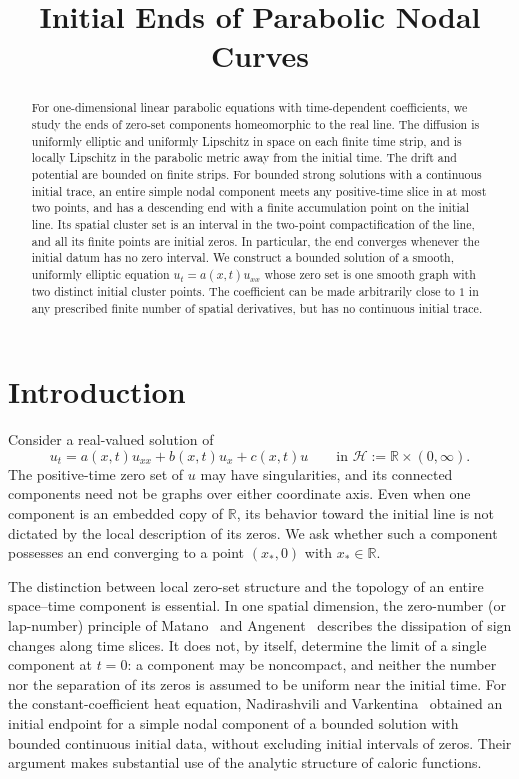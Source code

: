 \documentclass[11pt,reqno]{amsart}
\title[Initial ends of parabolic nodal curves]{Initial Ends of Parabolic Nodal Curves}
\date{}
\numberwithin{equation}{section}
\theoremstyle{definition}
\theoremstyle{remark}
\newcommand{\R}{\mathbb R}
\newcommand{\HH}{\mathcal H}
\begin{document}
\begin{abstract}
For one-dimensional linear parabolic equations with time-dependent coefficients,
we study the ends of zero-set components homeomorphic to the real line.
The diffusion is uniformly elliptic and uniformly Lipschitz in space on each
finite time strip, and is locally Lipschitz in the parabolic metric away from
the initial time.  The drift and potential are bounded on finite strips.
For bounded strong solutions with a continuous initial trace, an entire
simple nodal component meets any positive-time slice in at most two points,
and has a descending end with a finite accumulation point on the initial
line.  Its spatial cluster set is an interval in the two-point
compactification of the line, and all its finite points are initial zeros.
In particular, the end converges whenever the initial datum has no zero
interval.  We construct a bounded solution of a smooth, uniformly elliptic
equation $u_t=a(x,t)u_{xx}$ whose zero set is one smooth graph with two
distinct initial cluster points.  The coefficient can be made arbitrarily
close to $1$ in any prescribed finite number of spatial derivatives, but
has no continuous initial trace.
\end{abstract}

\maketitle

\section{Introduction}\label{sec:intro}
Consider a real-valued solution of
\begin{equation}\label{eq:main}
 u_t=a(x,t)u_{xx}+b(x,t)u_x+c(x,t)u
 \qquad \text{in }\HH:=\R\times(0,\infty).
\end{equation}
The positive-time zero set of $u$ may have singularities, and its
connected components need not be graphs over either coordinate axis.
Even when one component is an embedded copy of $\R$, its behavior toward
the initial line is not dictated by the local description of its zeros.
We ask whether such a component possesses an end converging to a point
$(x_*,0)$ with $x_*\in\R$.

The distinction between local zero-set structure and the topology of an
entire space--time component is essential.  In one spatial dimension, the
zero-number (or lap-number) principle of Matano~\cite{Matano} and
Angenent~\cite{Angenent} describes the dissipation of sign changes
along time slices.  It does not, by itself, determine the limit of a
single component at $t=0$: a component may be noncompact, and neither
the number nor the separation of its zeros is assumed to be uniform
near the initial time.  For the constant-coefficient heat equation,
Nadirashvili and Varkentina~\cite[Theorem~2]{NV} obtained an initial
endpoint for a simple nodal component of a bounded solution with bounded
continuous initial data, without excluding initial intervals of zeros.
Their argument makes substantial use of the analytic structure of caloric
functions.
\end{document}
